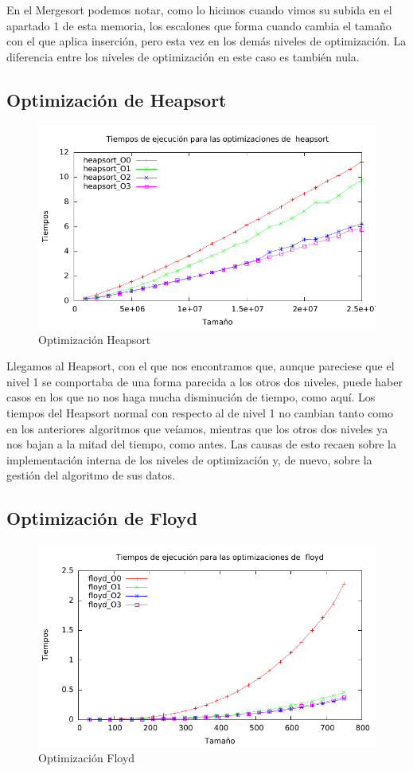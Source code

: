 \documentclass[a4paper, 11pt]{article}
\begin{document}
En el Mergesort podemos notar, como lo hicimos cuando vimos su subida en el apartado 1 de esta memoria, los escalones que forma cuando cambia el tamaño con el que aplica inserción, pero esta vez en los demás niveles de optimización. La diferencia entre los niveles de optimización en este caso es también nula. 
\newpage
\subsection{Optimización de Heapsort}

\begin{figure}[H]\includegraphics[width=12cm]{img/heapsort_optim_g.pdf} \centering
	\caption{Optimización Heapsort}\end{figure}

Llegamos al Heapsort, con el que nos encontramos que, aunque pareciese que el nivel 1 se comportaba de una forma parecida a los otros dos niveles, puede haber casos en los que no nos haga mucha disminución de tiempo, como aquí. Los tiempos del Heapsort normal con respecto al de nivel 1 no cambian tanto como en los anteriores algoritmos que veíamos, mientras que los otros dos niveles ya nos bajan a la mitad del tiempo, como antes. Las causas de esto recaen sobre la implementación interna de los niveles de optimización y, de nuevo, sobre la gestión del algoritmo de sus datos.

\newpage
\subsection{Optimización de Floyd}

\begin{figure}[H]\includegraphics[width=13cm]{img/floyd_optim_g.pdf} \centering
	\caption{Optimización Floyd}\end{figure}
\end{document}

